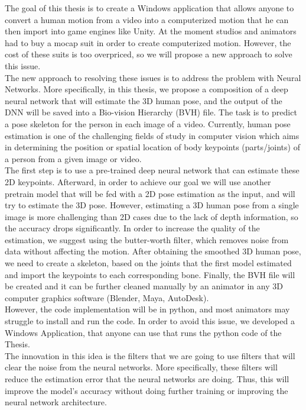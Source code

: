 The goal of this thesis is to create a Windows application that allows anyone to convert a human motion from a video into a computerized motion that he can then import into game engines like Unity. At the moment studios and animators had to buy a mocap suit in order to create computerized motion. However, the cost of these suits is too overpriced, so we will propose a new approach to solve this issue.\\

The new approach to resolving these issues is to address the problem with Neural Networks. More specifically, in this thesis, we propose a composition of a deep neural network \cite{Exploiting temporal information for 3D pose estimation,3D human pose estimation in video with temporal convolutions and semi-supervised training} that will estimate the 3D human pose, and the output of the DNN will be saved into a Bio-vision Hierarchy (BVH) file. The task is to predict a pose skeleton for the person in each image of a video. Currently, human pose estimation is one of the challenging fields of study in computer vision which aims in determining the position or spatial location of body keypoints (parts/joints) of a person from a given image or video. \\

The first step is to use a pre-trained deep neural network that can estimate these 2D keypoints. Afterward, \cite{3D Human Pose Estimation from Deep Multi-View 2D Pose,3D Human Pose Estimation Using Convolutional Neural Networks with 2D Pose Information} in order to achieve our goal we will use another pretrain model that will be fed with a 2D pose estimation as the input, and will try to estimate the 3D pose. However, estimating a 3D human pose from a single image is more challenging than 2D cases due to the lack of depth information, so the accuracy drops significantly. In order to increase the quality of the estimation, we suggest using the butter-worth filter, which removes noise from data without affecting the motion. After obtaining the smoothed 3D human pose, we need to create a skeleton, based on the joints that the first model estimated and import the keypoints to each corresponding bone. Finally, the BVH file will be created and it can be further cleaned manually by an animator in any 3D computer graphics software (Blender, Maya, AutoDesk). \\

However, the code implementation will be in python, and most animators may struggle to install and run the code. In order to avoid this issue, we developed a Windows Application, that anyone can use that runs the python code of the Thesis. \\

The innovation in this idea is the filters that we are going to use filters that will clear the noise from the neural networks. More specifically, these filters will reduce the estimation error that the neural networks are doing. Thus, this will improve the model's accuracy without doing further training or improving the neural network architecture.  